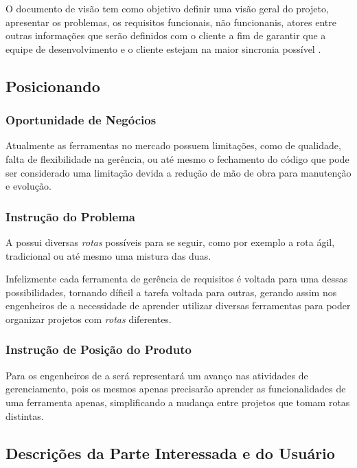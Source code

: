 
O documento de visão tem como objetivo definir uma visão geral do projeto, apresentar os problemas, os requisitos funcionais, não funcionanis, atores entre outras informações que serão definidos com o cliente a fim de garantir que a equipe de desenvolvimento e o cliente estejam na maior sincronia possível \cite{IBM:2014:Online}.

\subsection{Posicionando}
\subsubsection{Oportunidade de Negócios}

Atualmente as ferramentas no mercado possuem limitações, como de qualidade, falta de flexibilidade na gerência, ou até mesmo o fechamento do código que pode ser considerado uma limitação devida a redução de mão de obra para manutenção e evolução.

\subsubsection{Instrução do Problema}

A \er{} possui diversas \textit{rotas} possíveis para se seguir, como por exemplo a rota ágil, tradicional ou até mesmo uma mistura das duas.

Infelizmente cada ferramenta de gerência de requisitos é voltada para uma dessas possibilidades, tornando díficil a tarefa voltada para outras, gerando assim nos engenheiros de \er{} a necessidade de aprender utilizar diversas ferramentas para poder organizar projetos com \textit{rotas} diferentes.

\subsubsection{Instrução de Posição do Produto}

Para os engenheiros de \er{} a \nomeFerramenta{} será representará um avanço nas atividades de gerenciamento, pois os mesmos apenas precisarão aprender as funcionalidades de uma ferramenta apenas, simplificando a mudança entre projetos que tomam rotas distintas.

\subsection{Descrições da Parte Interessada e do Usuário}

